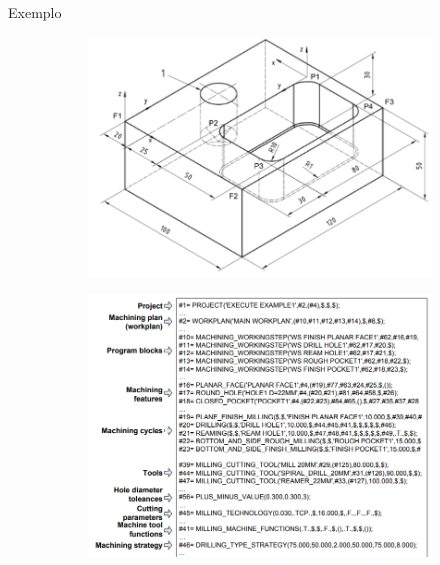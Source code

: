 \documentclass[aspectratio=169]{beamer}
\begin{document}
{\begin{frame}{Exemplo}
  \begin{figure}[H]
    \centering
    \begin{subfigure}[b]{0.46\textwidth}
        \includegraphics[width=\textwidth]{part1.png}
    \end{subfigure}
    \qquad
    \begin{subfigure}[b]{0.46\textwidth}
        \includegraphics[width=\textwidth]{step-nc-sample-1.png}
    \end{subfigure}
\end{figure}

\end{frame}


}
\end{document}
